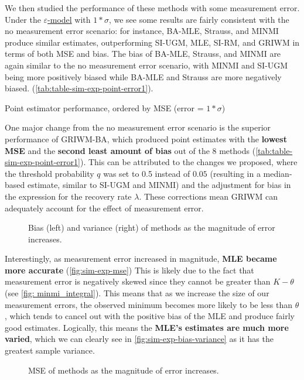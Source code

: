 We then studied the performance of these methods with some measurement error. Under the  \hyperref[model: measurement-error]{$\varepsilon$-model} with $1*\sigma$, we see some results are fairly consistent with the no measurement error scenario: for instance, BA-MLE, Strauss, and MINMI produce similar estimates, outperforming SI-UGM, MLE, SI-RM, and GRIWM in terms of both MSE and bias. The bias of BA-MLE, Strauss, and MINMI are again similar to the no measurement error scenario, with MINMI and SI-UGM being more positively biased while BA-MLE and Strauss are more negatively biased. (\autoref{tab:table-sim-exp-point-error1}).
\begin{table}[ht]
    \centering
    \caption{Point estimator performance, ordered by MSE (error = $1*\sigma$)}
    
    \label{tab:table-sim-exp-point-error1}
\end{table}

One major change from the no measurement error scenario is the superior performance of GRIWM-BA, which produced point estimates with the \textbf{lowest MSE} and the \textbf{second least amount of bias} out of the 8 methods (\autoref{tab:table-sim-exp-point-error1}). This can be attributed to the changes we proposed, where the threshold probability $q$ was set to 0.5 instead of $0.05$ (resulting in a median-based estimate, similar to SI-UGM and MINMI) and the adjustment for bias in the expression for the recovery rate $\lambda$. These corrections mean GRIWM can adequately account for the effect of measurement error.
\begin{figure}[ht]
    \centering
    
    \caption{Bias (left) and variance (right) of methods as the magnitude of error increases.}
    \label{fig:sim-exp-bias-variance}
\end{figure}

Interestingly, as measurement error increased in magnitude, \textbf{MLE became more accurate} (\autoref{fig:sim-exp-mse}) This is likely due to the fact that measurement error is negatively skewed since they cannot be greater than $K-\theta$ (see \autoref{fig: minmi_integral}). This means that as we increase the size of our measurement errors, the observed minimum becomes more likely to be less than $\theta$, which tends to cancel out with the positive bias of the MLE and produce fairly good estimates. Logically, this means the \textbf{MLE's estimates are much more varied}, which we can clearly see in \autoref{fig:sim-exp-bias-variance} as it has the greatest sample variance.
\begin{figure}[ht]
    \centering
    \caption{MSE of methods as the magnitude of error increases.}
    \label{fig:sim-exp-mse}
\end{figure}

